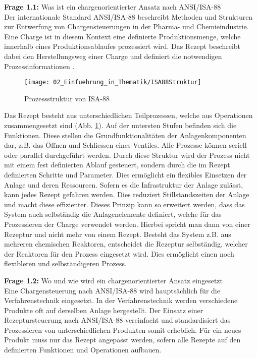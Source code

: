 	\textbf{Frage 1.1:} Was ist ein chargenorientierter Ansatz nach ANSI/ISA-88 \vspace{2mm} 
	\\
		Der internationale Standard ANSI/ISA-88 beschreibt Methoden und Strukturen zur Entwerfung von Chargensteuerungen in der Pharma- und Chemieindustrie. Eine Charge ist in diesem Kontext eine definierte Produktionsmenge, welche innerhalb eines Produktionsablaufes prozessiert wird.  Das Rezept beschreibt dabei den Herstellungsweg einer Charge und definiert die notwendigen Prozessinformationen \cite{ISA-88}. 
		
		\begin{figure}[h!]
			\centering
			\texttt{[image: 02\_Einfuehrung\_in\_Thematik/ISA88Struktur]}
			\captionsetup{justification=centering}
			\caption{Prozessstruktur von ISA-88}
			\label{fig:Prozessstruktur_ISA88}
		\end{figure}
		
		Das Rezept besteht aus unterschiedlichen Teilprozessen, welche aus Operationen zusammengesetzt sind (Abb. \ref{fig:Prozessstruktur_ISA88}). Auf der untersten Stufen befinden sich die Funktionen. Diese stellen die Grundfunktionalitäten der Anlagenkomponenten dar, z.B. das Öffnen und Schliessen eines Ventiles. Alle Prozesse können seriell oder parallel durchgeführt werden. Durch diese Struktur wird der Prozess nicht mit einem fest definierten Ablauf gesteuert, sondern durch die im Rezept definierten Schritte und Parameter. Dies ermöglicht ein flexibles Einsetzen der Anlage und deren Ressourcen. Sofern es die Infrastruktur der Anlage zulässt, kann jedes Rezept gefahren werden. Dies reduziert Stillstandszeiten der Anlage und macht diese effizienter. Dieses Prinzip kann so erweitert werden, dass das System auch selbständig die Anlagenelemente definiert, welche für das Prozessieren der Charge verwendet werden. Hierbei spricht man dann von einer Rezeptur und nicht mehr von einem Rezept. Besteht das System z.B. aus mehreren chemischen Reaktoren, entscheidet die Rezeptur selbständig, welcher der Reaktoren für den Prozess eingesetzt wird. Dies ermöglicht einen noch flexibleren und selbständigeren Prozess.
		
	\vspace{3mm}
	
	\textbf{Frage 1.2:} Wo und wie wird ein chargenorientierter Ansatz eingesetzt \vspace{2mm} 
	\\
		Eine Chargensteuerung nach ANSI/ISA-88 wird hauptsächlich für die Verfahrenstechnik eingesetzt. In der Verfahrenstechnik werden verschiedene Produkte oft auf derselben Anlage hergestellt. Der Einsatz einer Rezeptursteuerung nach ANSI/ISA-88 vereinfacht und standardisiert das Prozessieren von unterschiedlichen Produkten somit erheblich. Für ein neues Produkt muss nur das Rezept angepasst werden, sofern alle Rezepte auf den definierten Funktionen und Operationen aufbauen. 
		

